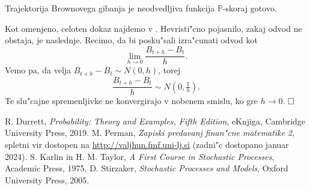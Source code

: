 \documentclass[twoside,11pt]{article}
\begin{document}
\begin{izrek}
    Trajektorija Brownovega gibanja je neodvedljiva funkcija $\mathbb{P}$-skoraj gotovo.
\end{izrek}

\begin{dokaz}
    Kot omenjeno, celoten dokaz najdemo v \cite{1}. Hevristi"cno pojasnilo, zakaj odvod ne obstaja, je naslednje. Recimo, da bi posku"sali izra"cunati odvod kot
    $$
        \lim_{h\to0}\frac{B_{t+h} - B_t}{h}.
    $$
    Vemo pa, da velja $B_{t+h} - B_t \sim N(0, h)$, torej
    $$
        \frac{B_{t+h} - B_t}{h} \sim N(0, \tfrac{1}{h}).
    $$
    Te slu"cajne spremenljivke ne konvergirajo v nobenem smislu, ko gre $h \rightarrow 0$. 
    $\hfill \square$
\end{dokaz}

\begin{thebibliography}{99}

 R. Durrett, \emph{Probability: Theory and Examples, Fifth Edition}, eKnjiga, Cambridge University Press, 2019. 
 M. Perman, \emph{Zapiski predavanj finan"cne matematike 2}, spletni vir dostopen na \href{http://valjhun.fmf.uni-lj.si}{http://valjhun.fmf.uni-lj.si} (zadni"c dostopano januar 2024).
 S. Karlin in H. M. Taylor, \emph{A First Course in Stochastic Processes}, Academic Press, 1975.
 D. Stirzaker, \emph{Stochastic Processes and Models}, Oxford University Press, 2005.


\end{thebibliography}
\end{document}
